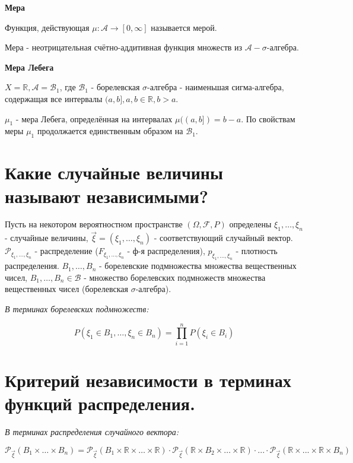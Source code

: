 \noindent \textbf{Мера}

\noindent Функция, действующая $\mu: \mathcal{A} \to [0, \infty]$ называется мерой.

\noindent Мера - неотрицательная счётно-аддитивная функция множеств из $\mathcal{A} - \sigma$-алгебра.

\noindent \textbf{Мера Лебега}

\noindent $X = \mathbb{R}, \mathcal{A} = \mathcal{B}_1$, где $\mathcal{B}_1$ - борелевская $\sigma$-алгебра - наименьшая сигма-алгебра, содержащая все интервалы $(a, b], a, b \in \mathbb{R}, b > a$.

\noindent $\mu_1$ - мера Лебега, определённая на интервалах $\mu ((a, b]) = b - a$. По свойствам меры $\mu_1$ продолжается единственным образом на $\mathcal{B}_1$.

\section{Какие случайные величины называют независимыми?}

Пусть на некотором вероятностном пространстве $(\Omega, \mathcal{F}, P)$ определены $\xi_1, \dots, \xi_n$ - случайные величины, $\vec{\xi} = (\xi_1, \dots, \xi_n)$ - соответствующий случайный вектор. $\mathcal{P}_{\xi_1, \dots, \xi_n}$ - распределение ($F_{\xi_1, \dots, \xi_n}$ - ф-я распределения), $p_{\xi_1, \dots, \xi_n}$ - плотность распределения. $B_1, \dots, B_n$ - борелевские подмножества множества вещественных чисел, $B_1, \dots, B_n \in \mathcal{B}$ - множество борелевских подмножеств множества вещественных чисел (борелевская $\sigma$-алгебра).

\textit{В терминах борелевских подмножеств:}

\[ P(\xi_1 \in B_1, \dots, \xi_n \in B_n) = \prod_{i=1}^{n} P(\xi_i \in B_i) \]

\section{Критерий независимости в терминах функций распределения.}

\textit{В терминах распределения случайного вектора:}

\[ \mathcal{P}_{\vec{\xi}} (B_1 \times \dots \times B_n) = \mathcal{P}_{\vec{\xi}} (B_1 \times \mathbb{R} \times \dots \times \mathbb{R}) \cdot \mathcal{P}_{\vec{\xi}} (\mathbb{R} \times B_2 \times \dots \times \mathbb{R}) \cdot ... \cdot \mathcal{P}_{\vec{\xi}} (\mathbb{R} \times ... \times \mathbb{R} \times B_n) \]

